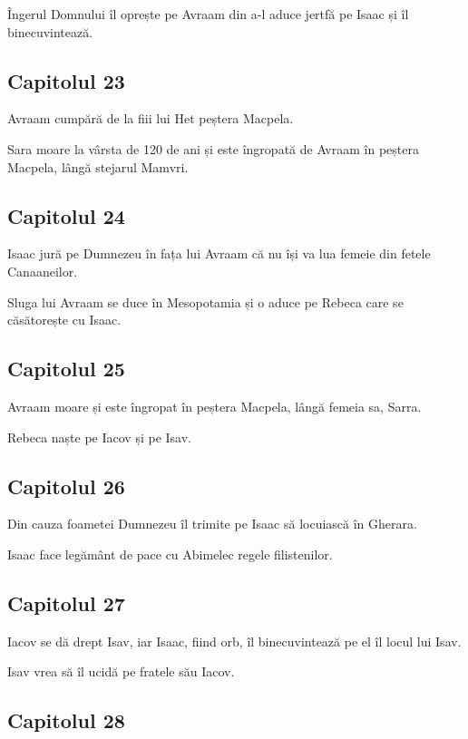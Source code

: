\documentclass[12pt,a4paper]{article}
\begin{document}
Îngerul Domnului îl oprește pe Avraam din a-l aduce jertfă pe Isaac
și îl binecuvintează.

\subsection{Capitolul 23}

Avraam cumpără de la fiii lui Het peștera Macpela.

Sara moare la vârsta de 120 de ani și este îngropată de Avraam în peștera Macpela, lângă stejarul Mamvri.


\subsection{Capitolul 24}

Isaac jură pe Dumnezeu în fața lui Avraam că nu își va lua femeie din fetele Canaaneilor.

Sluga lui Avraam se duce în Mesopotamia și o aduce pe Rebeca care se căsătorește cu Isaac.

\subsection{Capitolul 25}

Avraam moare și este îngropat în peștera Macpela, lângă femeia sa, Sarra.

Rebeca naște pe Iacov și pe Isav.

\subsection{Capitolul 26}

Din cauza foametei Dumnezeu îl trimite pe Isaac să locuiască în Gherara.

Isaac face legământ de pace cu Abimelec regele filistenilor.

\subsection{Capitolul 27}


Iacov se dă drept Isav, iar Isaac, fiind orb, îl binecuvintează pe el îl
locul lui Isav.

Isav vrea să îl ucidă pe fratele său Iacov.


\subsection{Capitolul 28}
\end{document}
